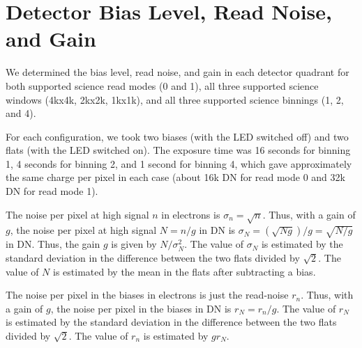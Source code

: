 \documentclass{article}
\newcommand{\code}[1]{{\ttfamily #1}}
\begin{document}
\section{Detector Bias Level, Read Noise, and Gain}

We determined the bias level, read noise, and gain in each detector quadrant for both supported science read modes (0 and 1), all three supported science windows (\code{4kx4k}, \code{2kx2k}, \code{1kx1k}), and all three supported science binnings (1, 2, and 4).

For each configuration, we took two biases (with the LED switched off) and two flats (with the LED switched on). The exposure time was 16 seconds for binning 1, 4 seconds for binning 2, and 1 second for binning 4, which gave approximately the same charge per pixel in each case (about 16k DN for read mode 0 and 32k DN for read mode 1).

The noise per pixel at high signal $n$ in electrons is $\sigma_n = \sqrt{n}$. Thus, with a gain of $g$, the noise per pixel at high signal $N=n/g$ in DN is $\sigma_N = (\sqrt{Ng})/g = \sqrt{N/g}$ in DN. Thus, the gain $g$ is given by $N/\sigma_N^2$. The value of $\sigma_N$ is estimated by the standard deviation in the difference between the two flats divided by $\sqrt{2}$. The value of $N$ is estimated by the mean in the flats after subtracting a bias.

The noise per pixel in the biases in electrons is just the read-noise $r_n$. Thus, with a gain of $g$, the noise per pixel in the biases in DN is $r_N = r_n/g$. The value of $r_N$ is estimated by the standard deviation in the difference between the two flats divided by $\sqrt{2}$. The value of $r_n$ is estimated by $gr_N$.
\end{document}
